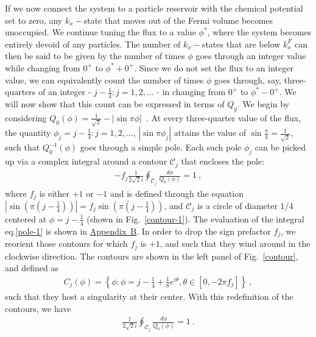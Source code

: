 If we now connect the system to a particle reservoir with the chemical potential set to zero, any \(k_x-\)state that moves out of the Fermi volume becomes unoccupied. We continue tuning the flux to a value \(\phi^*\), where the system becomes entirely devoid of any particles. The number of \(k_x-\)states that are below \(k_x^F\) can then be said to be given by the number of times \(\phi\) goes through an integer value while changing from \(0^+\) to \(\phi^* + 0^+\). Since we do not set the flux to an integer value, we can equivalently count the number of times \(\phi\) goes through, say, three-quarters of an integer - \(j - \frac{1}{4}: j = 1,2,\ldots\) - in changing from \(0^+\) to \(\phi^*-0^+\). We will now show that this count can be expressed in terms of \(Q_g\). We begin by considering \(Q_0(\phi) = \frac{1}{\sqrt 2} - |\sin \pi\phi|\)~. At every three-quarter value of the flux, the quantity \(\phi_j = j - \frac{1}{4}: j=1,2,\ldots\), \(|\sin\pi\phi_j|\) attains the value of \(\sin \frac{\pi}{4} = \frac{1}{\sqrt 2}\), such that \(Q^{-1}_0(\phi)\) goes through a simple pole. Each such pole \(\phi_j\) can be picked up via a complex integral around a contour \(\mathcal{C}_j\) that encloses the pole:
\begin{equation}\begin{aligned}
	\label{pole-1}
	-f_j \frac{1}{2\sqrt 2 i}\oint_{\mathcal{C}_j} \frac{d\phi}{Q_0(\phi)} = 1~,
\end{aligned}\end{equation}
where \(f_j\) is either \(+1\) or \(-1\) and is defined through the equation \(|\sin\left( \pi \left( j - \frac{1}{4} \right)  \right)| = f_j\sin\left( \pi \left( j - \frac{1}{4} \right)  \right)\), and \(\mathcal{C}_j\) is a circle of diameter \(1/4\) centered at \(\phi = j-\frac{1}{4}\) (shown in Fig.~\ref{contour-1}).
The evaluation of the integral eq.\eqref{pole-1} is shown in \hyperref[contour-integral]{Appendix~B}.
In order to drop the sign prefactor \(f_j\), we reorient those contours for which \(f_j\) is \(+1\), and such that they wind around in the clockwise direction. The contours are shown in the left panel of Fig.~\ref{contour}, and defined as
\begin{equation}\begin{aligned}
	\label{curves0}
	C_j(\phi) = \left\{\phi: \phi = j - \frac{1}{4} + \frac{1}{8}e^{i\theta}, \theta \in \left[0, -2\pi f_j\right] \right\}~,
\end{aligned}\end{equation}
such that they host a singularity at their center. With this redefinition of the contours, we have
\begin{equation}\begin{aligned}
	\frac{1}{2 \sqrt 2 i}\oint_{\mathcal{C}_j} \frac{d\phi}{Q_0(\phi)} = 1~.
\end{aligned}\end{equation}

